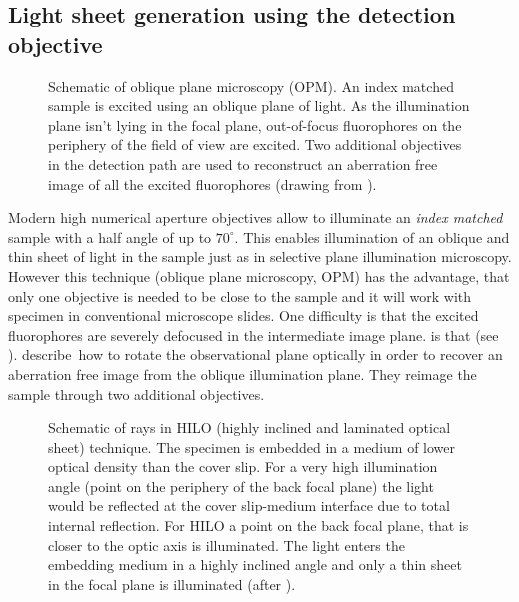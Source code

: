 \subsection{Light sheet generation using the detection objective}
\label{sec:hilo}
\begin{figure}[!hbt]
  \centering
  \caption{Schematic of oblique plane microscopy (OPM). An index
    matched sample is excited using an oblique plane of light. As the
    illumination plane isn't lying in the focal plane, out-of-focus
    fluorophores on the periphery of the field of view are
    excited. Two additional objectives in the detection path are used
    to reconstruct an aberration free image of all the excited
    fluorophores (drawing from \cite{Dunsby2008}).}
  \label{fig:dunsby}
\end{figure}
Modern high numerical aperture objectives allow to illuminate an
\emph{index matched} sample with a half angle of up to
$70^\circ$. This enables illumination of an oblique and thin sheet of
light in the sample just as in selective plane illumination
microscopy. However this technique (oblique plane microscopy, OPM) has
the advantage, that only one objective is needed to be close to the
sample and it will work with specimen in conventional microscope
slides. One difficulty is that the excited fluorophores are severely
defocused in the intermediate image plane. is that (see
). \cite{Dunsby2008} describe\ how to
rotate the observational plane optically in order to recover an
aberration free image from the oblique illumination plane. They
reimage the sample through two additional objectives.


\begin{figure}[!hbt]
  \centering
  
  \caption{Schematic of rays in HILO (highly inclined and laminated
    optical sheet) technique. The specimen is embedded in a medium of
    lower optical density than the cover slip. For a very high
    illumination angle (point on the periphery of the back focal
    plane) the light would be reflected at the cover slip-medium
    interface due to total internal reflection. For HILO a point on
    the back focal plane, that is closer to the optic axis is
    illuminated. The light enters the embedding medium in a highly
    inclined angle and only a thin sheet in the focal plane is
    illuminated (after \cite{Tokunaga2008}).}
  \label{fig:hilo}
\end{figure}

